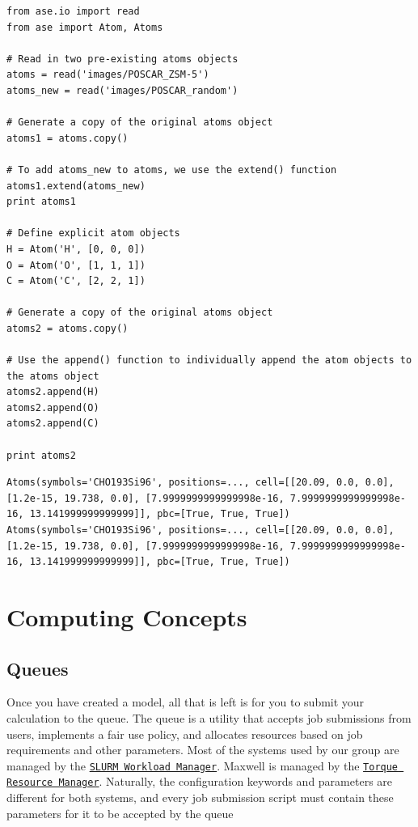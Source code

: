 \documentclass[11pt]{article}
\begin{document}
\begin{verbatim}
from ase.io import read
from ase import Atom, Atoms

# Read in two pre-existing atoms objects
atoms = read('images/POSCAR_ZSM-5')
atoms_new = read('images/POSCAR_random')

# Generate a copy of the original atoms object
atoms1 = atoms.copy()

# To add atoms_new to atoms, we use the extend() function
atoms1.extend(atoms_new)
print atoms1

# Define explicit atom objects
H = Atom('H', [0, 0, 0])
O = Atom('O', [1, 1, 1]) 
C = Atom('C', [2, 2, 1])

# Generate a copy of the original atoms object
atoms2 = atoms.copy()

# Use the append() function to individually append the atom objects to the atoms object
atoms2.append(H)
atoms2.append(O)
atoms2.append(C)

print atoms2
\end{verbatim}

\begin{verbatim}
Atoms(symbols='CHO193Si96', positions=..., cell=[[20.09, 0.0, 0.0], [1.2e-15, 19.738, 0.0], [7.9999999999999998e-16, 7.9999999999999998e-16, 13.141999999999999]], pbc=[True, True, True])
Atoms(symbols='CHO193Si96', positions=..., cell=[[20.09, 0.0, 0.0], [1.2e-15, 19.738, 0.0], [7.9999999999999998e-16, 7.9999999999999998e-16, 13.141999999999999]], pbc=[True, True, True])
\end{verbatim}

\section{Computing Concepts}
\label{sec-3}
\subsection{Queues}
\label{sec-3-1}
Once you have created a model, all that is left is for you to submit your calculation to the queue. The queue is a utility that accepts job submissions from users, implements a fair use policy, and allocates resources based on job requirements and other parameters. Most of the systems used by our group are managed by the \href{http://slurm.schedmd.com/}{\texttt{SLURM Workload Manager}}. Maxwell is managed by the \href{http://www.adaptivecomputing.com/products/open-source/torque/}{\texttt{Torque Resource Manager}}. Naturally, the configuration keywords and parameters are different for both systems, and every job submission script must contain these parameters for it to be accepted by the queue
\end{document}
